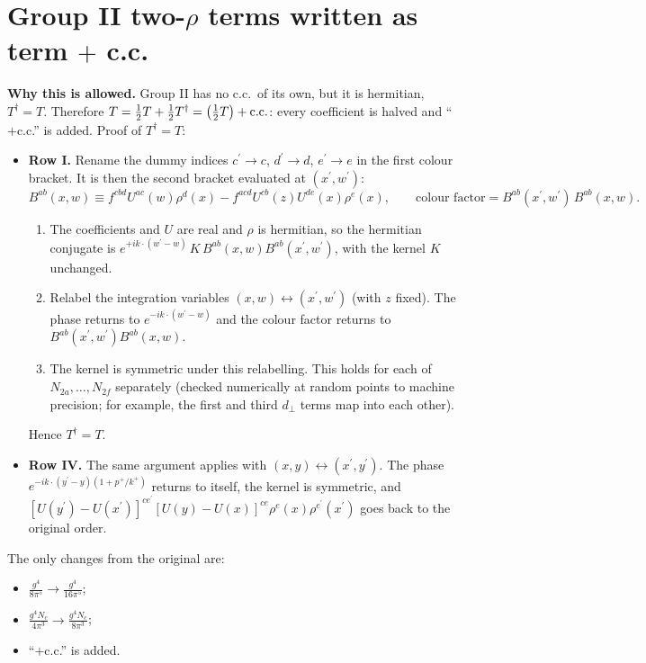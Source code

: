 \documentclass[10pt]{article}
\begin{document}
\section*{Group II two-$\rho$ terms written as term $+$ c.c.}
\noindent\textbf{Why this is allowed.} Group II has no c.c.\ of its own, but it is hermitian, $T^{\dagger}=T$. Therefore $T=\tfrac12 T+\tfrac12 T^{\dagger}=\big(\tfrac12 T\big)+{\rm c.c.}$: every coefficient is halved and ``$+$c.c.'' is added. Proof of $T^{\dagger}=T$:
\begin{itemize}
\item \textbf{Row I.} Rename the dummy indices $c^{\prime}\to c$, $d^{\prime}\to d$, $e^{\prime}\to e$ in the first colour bracket. It is then the second bracket evaluated at $(x^{\prime},w^{\prime})$:
\begin{equation*}
B^{ab}(x,w)\equiv f^{cbd}U^{ac}(w)\rho^{d}(x)-f^{acd}U^{cb}(z)U^{de}(x)\rho^{e}(x),\qquad\text{colour factor}=B^{ab}(x^{\prime},w^{\prime})\,B^{ab}(x,w).
\end{equation*}
\begin{enumerate}
\item The coefficients and $U$ are real and $\rho$ is hermitian, so the hermitian conjugate is $e^{+ik\cdot(w^{\prime}-w)}\,K\,B^{ab}(x,w)B^{ab}(x^{\prime},w^{\prime})$, with the kernel $K$ unchanged.
\item Relabel the integration variables $(x,w)\leftrightarrow(x^{\prime},w^{\prime})$ (with $z$ fixed). The phase returns to $e^{-ik\cdot(w^{\prime}-w)}$ and the colour factor returns to $B^{ab}(x^{\prime},w^{\prime})B^{ab}(x,w)$.
\item The kernel is symmetric under this relabelling. This holds for each of $N_{2a},\dots,N_{2f}$ separately (checked numerically at random points to machine precision; for example, the first and third $d_{\perp}$ terms map into each other).
\end{enumerate}
Hence $T^{\dagger}=T$.
\item \textbf{Row IV.} The same argument applies with $(x,y)\leftrightarrow(x^{\prime},y^{\prime})$. The phase $e^{-ik\cdot(y^{\prime}-y)(1+p^{+}/k^{+})}$ returns to itself, the kernel is symmetric, and $[U(y^{\prime})-U(x^{\prime})]^{ce^{\prime}}[U(y)-U(x)]^{ce}\rho^{e}(x)\rho^{e^{\prime}}(x^{\prime})$ goes back to the original order.
\end{itemize}
\noindent The only changes from the original are:
\begin{itemize}
\item $\frac{g^{4}}{8\pi^{5}}\to\frac{g^{4}}{16\pi^{5}}$;
\item $\frac{g^{4}N_{c}}{4\pi^{3}}\to\frac{g^{4}N_{c}}{8\pi^{3}}$;
\item ``$+$c.c.'' is added.
\end{itemize}
\end{document}
